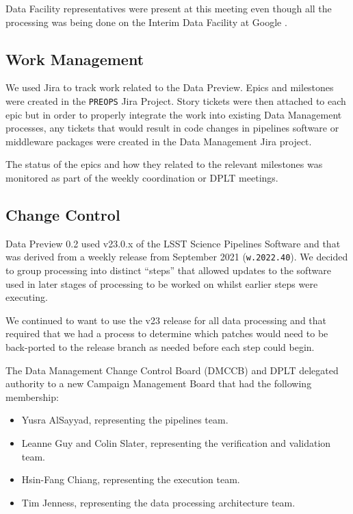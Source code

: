 Data Facility representatives were present at this meeting even though all the processing was being done on the Interim Data Facility at Google \citep{2021arXiv211115030O}.

\subsection{Work Management}

We used Jira to track work related to the Data Preview.
Epics and milestones were created in the \texttt{PREOPS} Jira Project.
Story tickets were then attached to each epic but in order to properly integrate the work into existing Data Management processes, any tickets that would result in code changes in pipelines software or middleware packages were created in the Data Management Jira project.

The status of the epics and how they related to the relevant milestones was monitored as part of the weekly coordination or DPLT meetings.

\subsection{Change Control}

Data Preview 0.2 used v23.0.x of the LSST Science Pipelines Software and that was derived from a weekly release from September 2021 (\texttt{w.2022.40}).
We decided to group processing into distinct ``steps'' that allowed updates to the software used in later stages of processing to be worked on whilst earlier steps were executing.

We continued to want to use the v23 release for all data processing and that required that we had a process to determine which patches would need to be back-ported to the release branch as needed before each step could begin.

The Data Management Change Control Board (DMCCB) and DPLT delegated authority to a new Campaign Management Board that had the following membership:

\begin{itemize}
\item Yusra AlSayyad, representing the pipelines team.
\item Leanne Guy and Colin Slater, representing the verification and validation team.
\item Hsin-Fang Chiang, representing the execution team.
\item Tim Jenness, representing the data processing architecture team.
\end{itemize}

